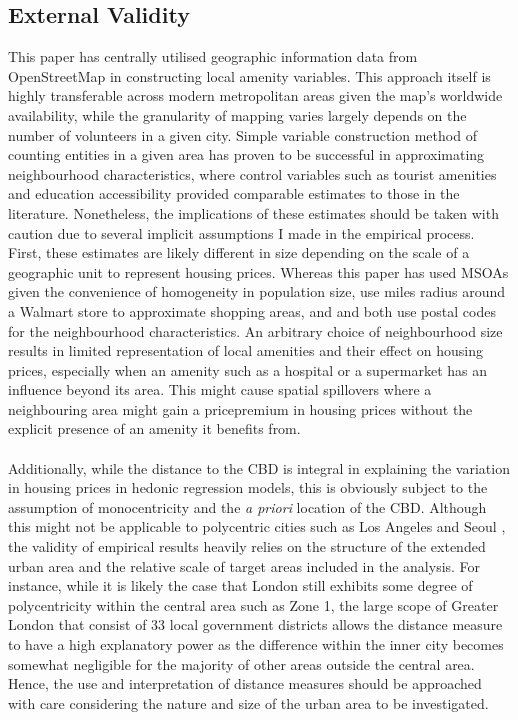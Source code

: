 \documentclass{article}
\begin{document}
\subsection{External Validity}
This paper has centrally utilised geographic information data from OpenStreetMap in constructing local amenity variables. This approach itself is highly transferable across modern metropolitan areas given the map's worldwide availability, while the granularity of mapping varies largely depends on the number of volunteers in a given city. Simple variable construction method of counting entities in a given area has proven to be successful in approximating neighbourhood characteristics, where control variables such as tourist amenities and education accessibility provided comparable estimates to those in the literature. Nonetheless, the implications of these estimates should be taken with caution due to several implicit assumptions I made in the empirical process. First, these estimates are likely different in size depending on the scale of a geographic unit to represent housing prices. Whereas this paper has used MSOAs given the convenience of homogeneity in population size,  \citet{Pope2015WhenAlways} use miles radius around a Walmart store to approximate shopping areas, and \citet{Biagi2015DoesItaly} and \citet{DepartmentforEducation2017HouseMore} both use postal codes for the neighbourhood characteristics. An arbitrary choice of neighbourhood size results in limited representation of local amenities and their effect on housing prices, especially when an amenity such as a hospital or a supermarket has an influence beyond its area. This might cause spatial spillovers where a neighbouring area might gain  a pricepremium in housing prices without the explicit presence of an amenity it benefits from.\\\\
Additionally, while the distance to the CBD is integral in explaining the variation in housing prices in hedonic regression models, this is obviously subject to the assumption of monocentricity and the \textit{a priori} location of the CBD. Although this might not be applicable to polycentric cities such as Los Angeles and Seoul \citep{Park2011SpatialAngeles}, the validity of empirical results heavily relies on the structure of the extended urban area and the relative scale of target areas included in the analysis. For instance, while it is likely the case that London still exhibits some degree of polycentricity within the central area such as Zone 1, the large scope of Greater London that consist of 33 local government districts allows the distance measure to have a high explanatory power as the difference within the inner city becomes somewhat negligible for the majority of other areas outside the central area. Hence, the use and interpretation of distance measures should be approached with care considering the nature and size of the urban area to be investigated.
\end{document}
